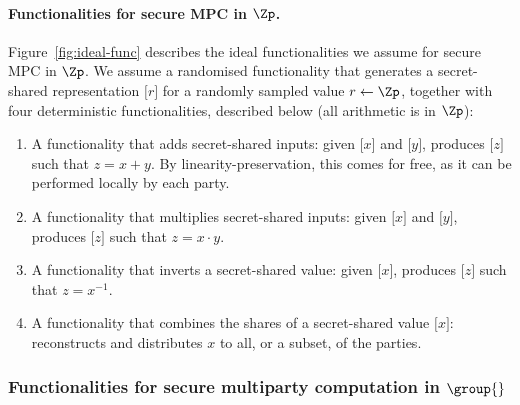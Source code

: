   \paragraph{Functionalities for secure MPC in $\Zp$.}
  Figure~\ref{fig:ideal-func} describes the ideal functionalities we assume for
  secure MPC in $\Zp$. We assume a randomised functionality that generates a
  secret-shared representation $\lbrack r\rbrack $ for a randomly sampled value
  $r\gets \Zp$, together with four deterministic functionalities, described
  below (all arithmetic is in $\Zp$):

  \begin{enumerate}

    \item A functionality that adds secret-shared inputs: given $\lbrack x
      \rbrack $ and $\lbrack y\rbrack $, produces $\lbrack z \rbrack $ such
      that $z = x + y$. By linearity-preservation, this comes for free, as it
      can be performed locally by each party.

    \item A functionality that multiplies secret-shared inputs: given $\lbrack
      x\rbrack $ and $\lbrack y\rbrack $, produces $\lbrack z\rbrack $ such
      that $z = x \cdot y$.

    \item A functionality that inverts a secret-shared value: given $\lbrack
      x\rbrack $, produces $\lbrack z\rbrack $ such that $z = x^{-1}$.

    \item A functionality that combines the shares of a secret-shared value
      $\lbrack x\rbrack $: reconstructs and distributes $x$ to all, or a
      subset, of the parties.

  \end{enumerate}

  \subsubsection{Functionalities for secure multiparty computation in
  $\group{}$}

